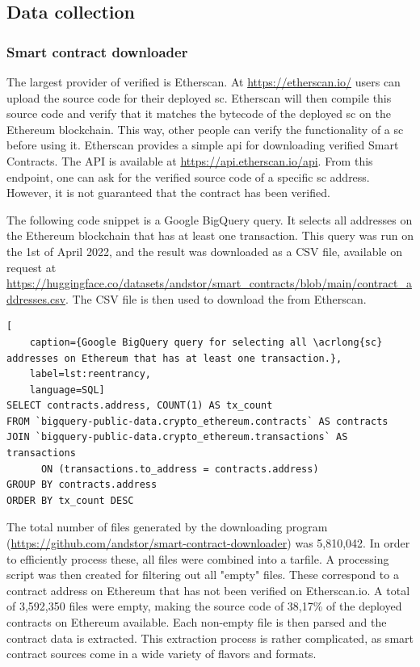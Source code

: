 \subsection{Data collection}
\label{sec:data-collection}

\subsubsection{Smart contract downloader}
\label{sec:smart-contract-downloader}

The largest provider of verified  is Etherscan. At \url{https://etherscan.io/} users can upload the source code for their deployed \acrshort{sc}. Etherscan will then compile this source code and verify that it matches the bytecode of the deployed \acrshort{sc} on the Ethereum blockchain. This way, other people can verify the functionality of a \acrshort{sc} before using it. Etherscan provides a simple \acrshort{api} for downloading verified Smart Contracts. The API is available at \url{https://api.etherscan.io/api}. From this endpoint, one can ask for the verified source code of a specific \acrshort{sc} address. However, it is not guaranteed that the contract has been verified.

The following code snippet is a Google BigQuery query. It selects all  addresses on the Ethereum blockchain that has at least one transaction. This query was run on the 1st of April 2022, and the result was downloaded as a CSV file, available on request at \url{https://huggingface.co/datasets/andstor/smart_contracts/blob/main/contract_addresses.csv}. The CSV file is then used to download the  from Etherscan.

\begin{lstlisting}[
    caption={Google BigQuery query for selecting all \acrlong{sc} addresses on Ethereum that has at least one transaction.},
    label=lst:reentrancy,
    language=SQL]
SELECT contracts.address, COUNT(1) AS tx_count
FROM `bigquery-public-data.crypto_ethereum.contracts` AS contracts
JOIN `bigquery-public-data.crypto_ethereum.transactions` AS transactions 
      ON (transactions.to_address = contracts.address)
GROUP BY contracts.address
ORDER BY tx_count DESC
\end{lstlisting}


The total number of files generated by the downloading program (\url{https://github.com/andstor/smart-contract-downloader}) was 5,810,042. In order to efficiently process these, all files were combined into a tarfile. A processing script was then created for filtering out all "empty" files. These correspond to a contract address on Ethereum that has not been verified on Etherscan.io. A total of 3,592,350 files were empty, making the source code of 38,17\% of the deployed contracts on Ethereum available. Each non-empty file is then parsed and the contract data is extracted. This extraction process is rather complicated, as smart contract sources come in a wide variety of flavors and formats. 

